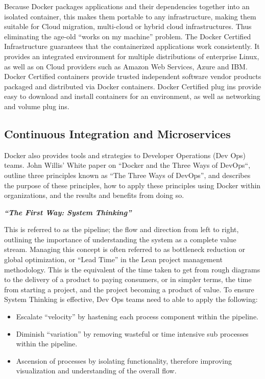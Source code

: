 Because Docker packages applications and their dependencies together into an isolated container, this makes them portable to any infrastructure, making them suitable for Cloud migration, multi-cloud or hybrid cloud infrastructures. Thus eliminating the age-old “works on my machine” problem. The Docker Certified Infrastructure guarantees that the containerized applications work consistently. It provides an integrated environment for multiple distributions of enterprise Linux, as well as on Cloud providers such as Amazon Web Services, Azure and IBM. Docker Certified containers provide trusted independent software vendor products packaged and distributed via Docker containers. Docker Certified plug ins provide easy to download and install containers for an environment, as well as networking and volume plug ins.

\subsection{Continuous Integration and Microservices}
Docker also provides tools and strategies to Developer Operations (Dev Ops) teams. John Willis’ White paper on “Docker and the Three Ways of DevOps“, outline three principles known as “The Three Ways of DevOps”, and describes the purpose of these principles, how to apply these principles using Docker within organizations, and the results and benefits from doing so. 



\textbf{\emph{“The First Way: System Thinking”}}

This is referred to as the pipeline; the flow and direction from left to right, outlining the importance of understanding the system as a complete value stream. Managing this concept is often referred to as bottleneck reduction or global optimization, or “Lead Time” in the Lean project management methodology\cite{willis}. This is the equivalent of the time taken to get from rough diagrams to the delivery of a product to paying consumers, or in simpler terms, the time from starting a project, and the project becoming a product of value\cite{willis}.  To ensure System Thinking is effective, Dev Ops teams need to able to apply the following:

\begin{itemize}
\item Escalate “velocity” by hastening each process component within the pipeline.
\item Diminish “variation” by removing wasteful or time intensive sub processes within the pipeline.
\item Ascension of processes by isolating functionality, therefore improving visualization and understanding of the overall flow.
\end{itemize}


